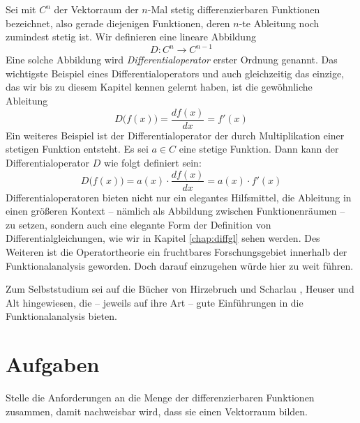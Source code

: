 Sei mit $C^n$ der Vektorraum der $n$-Mal stetig differenzierbaren Funktionen bezeichnet, also gerade diejenigen Funktionen, deren $n$-te Ableitung noch zumindest stetig ist. Wir definieren eine lineare Abbildung 
\begin{equation}
D : C^n \longrightarrow C^{n-1}
\end{equation}
Eine solche Abbildung wird \emph{Differentialoperator} erster Ordnung genannt. Das wichtigste Beispiel eines Differentialoperators und auch gleichzeitig das einzige, das wir bis zu diesem Kapitel kennen gelernt haben, ist die gewöhnliche Ableitung
\begin{equation}
D\big(f(x)\big) = \frac{d f(x)}{dx} = f'(x)
\end{equation}
Ein weiteres Beispiel ist der Differentialoperator der durch Multiplikation einer stetigen Funktion entsteht. Es sei $a\in C$ eine stetige Funktion. Dann kann der Differentialoperator $D$ wie folgt definiert sein:
\begin{equation}
D\big(f(x)\big) = a(x) \cdot \frac{d f(x)}{dx} = a(x) \cdot f'(x)
\end{equation}
Differentialoperatoren bieten nicht nur ein elegantes Hilfsmittel, die Ableitung in einen größeren Kontext -- nämlich als Abbildung zwischen Funktionenräumen -- zu setzen, sondern auch eine elegante Form der Definition von Differentialgleichungen, wie wir in Kapitel \ref{chap:diffgl} sehen werden. Des Weiteren ist die Operatortheorie ein fruchtbares Forschungsgebiet innerhalb der Funktionalanalysis geworden. Doch darauf einzugehen würde hier zu weit führen. 

Zum Selbststudium sei auf die Bücher von Hirzebruch und Scharlau \cite{HirzebruchScharlau199101}, Heuser \cite{Heuser200611} und Alt \cite{Alt201204} hingewiesen, die -- jeweils auf ihre Art -- gute Einführungen in die Funktionalanalysis bieten.

\section{Aufgaben}

\begin{prob}\label{prob:func}
Stelle die Anforderungen an die Menge der differenzierbaren Funktionen zusammen, damit nachweisbar wird, dass sie einen Vektorraum bilden.
\end{prob}

